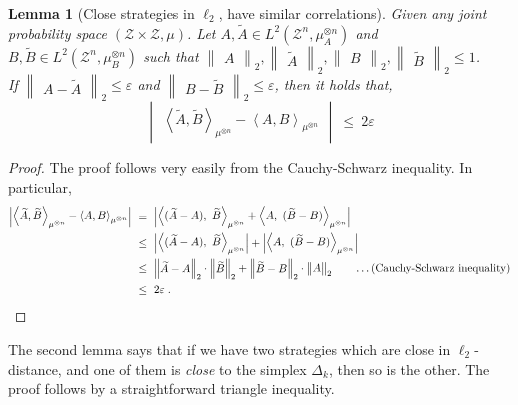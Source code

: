 \documentclass[11pt]{article}
\newcommand{\inparen}[1]{\left ( #1 \right )}
\newcommand{\inangle}[1]{\left \langle #1 \right \rangle}
\newcommand{\inabs}[1]{\begin{vmatrix} #1 \end{vmatrix}}
\newcommand{\norm}[2]{\begin{Vmatrix} #2 \end{Vmatrix}_{#1}}
\DeclareMathOperator*{\Ex}{\mathbb{E}}
\newcommand{\wtilde}[1]{\widetilde{#1}}
\newcommand{\eps}{\varepsilon}
\newcommand{\calZ}{\mathcal{Z}}
\newtheorem{lem}[theorem]{Lemma}
\begin{document}
\begin{lem}[Close strategies in $\ell_2$, have similar correlations]\label{lem:close-strategies}
	Given any joint probability space $(\calZ \times \calZ, \mu)$. Let $A, \wtilde{A} \in L^2(\calZ^n, \mu_A^{\otimes n})$ and $B, \wtilde{B} \in L^2(\calZ^n, \mu_B^{\otimes n})$ such that $\norm{2}{A}, \norm{2}{\wtilde{A}}, \norm{2}{B},\norm{2}{\wtilde{B}} \le 1$.\\
	If $\norm{2}{A - \wtilde{A}} \le \eps$ and $\norm{2}{B - \wtilde{B}} \le \eps$, then it holds that,
	\[ \inabs{\inangle{\wtilde{A}, \wtilde{B}}_{\mu^{\otimes n}} - \inangle{A, B}_{\mu^{\otimes n}}} ~\le~ 2\eps\]
\end{lem}
\begin{proof}%
	The proof follows very easily from the Cauchy-Schwarz inequality. In particular,
	\begin{align*}
	\inabs{\inangle{\wtilde{A}, \wtilde{B}}_{\mu^{\otimes n}} - \inangle{A, B}_{\mu^{\otimes n}}}
	&~=~ \inabs{\inangle{(\wtilde{A} - A), \ \wtilde{B}}_{\mu^{\otimes n}} + \inangle{A,\ (\wtilde{B} - B)}_{\mu^{\otimes n}}}\\
	&~\le~ \inabs{\inangle{(\wtilde{A} - A), \ \wtilde{B}}_{\mu^{\otimes n}}} + \inabs{\inangle{A,\ (\wtilde{B} - B)}_{\mu^{\otimes n}}}\\
	&~\le~ \norm{2}{\wtilde{A} - A} \cdot \norm{2}{\wtilde{B}} + \norm{2}{\wtilde{B} - B} \cdot \norm{2}{A} \qquad \ldots \text{(Cauchy-Schwarz inequality)}\\
	&~\le~ 2\eps\;. \qedhere
	\end{align*}
\end{proof}
\noindent The second lemma says that if we have two strategies which are close in $\ell_2$-distance, and one of them is {\em close} to the simplex $\Delta_k$, then so is the other. The proof follows by a straightforward triangle inequality.
\end{document}
